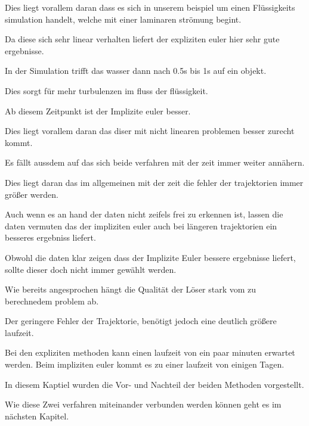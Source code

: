 Dies liegt vorallem daran dass es sich in unserem beispiel 
um einen Flüssigkeits simulation handelt, welche mit einer laminaren strömung begint.

Da diese sich sehr linear verhalten liefert der expliziten 
euler hier sehr gute ergebnisse.

In der Simulation trifft das wasser dann nach 0.5s bis 1s
auf ein objekt.

Dies sorgt für mehr turbulenzen im fluss der flüssigkeit.

Ab diesem Zeitpunkt ist der Implizite euler besser.

Dies liegt vorallem daran das diser mit nicht linearen problemen besser zurecht kommt.

Es fällt aussdem auf das sich beide verfahren mit der zeit
immer weiter annähern.

Dies liegt daran das im allgemeinen mit der zeit die fehler der
trajektorien immer größer werden.

Auch wenn es an hand der daten nicht zeifels frei zu erkennen ist,
lassen die daten vermuten das der impliziten euler auch bei längeren trajektorien ein besseres ergebniss liefert.

Obwohl die daten klar zeigen dass der Implizite Euler bessere
ergebnisse liefert, sollte dieser doch nicht immer gewählt werden.

Wie bereits angesprochen hängt die Qualität der Löser stark vom zu berechnedem problem ab.

Der geringere Fehler der Trajektorie, benötigt jedoch eine deutlich
größere laufzeit.

Bei den expliziten methoden kann einen laufzeit von ein paar minuten 
erwartet werden. Beim impliziten euler kommt es zu einer laufzeit von einigen Tagen. 

In diesem Kaptiel wurden die Vor- und Nachteil der beiden Methoden vorgestellt.

Wie diese Zwei verfahren miteinander verbunden werden können geht es im nächsten Kapitel.






